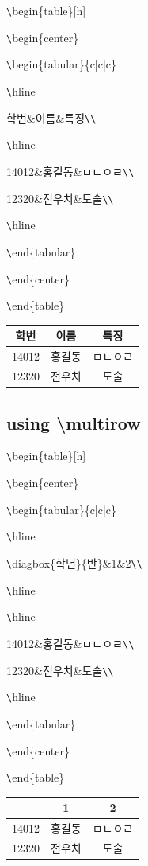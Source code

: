 \documentclass[11pt]{article}
\begin{document}
\longline

\verb+\+begin\{table\}[h]

\verb+\+begin\{center\}

\verb+\+begin\{tabular\}\{c|c|c\}

\verb+\+hline

학번\&이름\&특징\verb+\+\verb+\+

\verb+\+hline

14012\&홍길동\&ㅁㄴㅇㄹ\verb+\+\verb+\+

12320\&전우치\&도술\verb+\+\verb+\+

\verb+\+hline

\verb+\+end\{tabular\}

\verb+\+end\{center\}

\verb+\+end\{table\}

\begin{table}[!h]
	\begin{center}
		\begin{tabular}{c|c|c}
			\hline
			학번&이름&특징\\
			\hline
			14012&홍길동&ㅁㄴㅇㄹ\\
			12320&전우치&도술\\
			\hline
		\end{tabular}
	\end{center}
\end{table}

\subsection{using \textbackslash multirow}

\verb+\+begin\{table\}[h]

\verb+\+begin\{center\}

\verb+\+begin\{tabular\}\{c|c|c\}

\verb+\+hline

\verb+\+diagbox\{학년\}\{반\}\&1\&2\verb+\+\verb+\+

\verb+\+hline

\verb+\+hline

14012\&홍길동\&ㅁㄴㅇㄹ\verb+\+\verb+\+

12320\&전우치\&도술\verb+\+\verb+\+

\verb+\+hline

\verb+\+end\{tabular\}

\verb+\+end\{center\}

\verb+\+end\{table\}

\begin{table}[!h]
	\begin{center}
		\begin{tabular}{c|c|c}
			\hline
			\diagbox{학년}{반}&1&2\\
			\hline
			\hline
			14012&홍길동&ㅁㄴㅇㄹ\\
			12320&전우치&도술\\
			\hline
		\end{tabular}
	\end{center}
\end{table}
\end{document}
